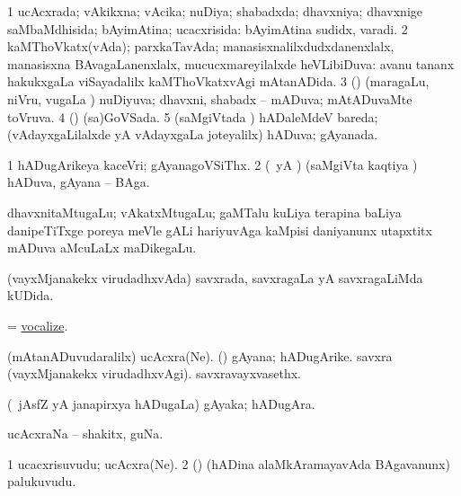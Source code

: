 \bentry
{} 
\gl{\gu}
\expl{}
\bmng
\bnum
\num{1} ucAcxrada; vAkikxna; vAcika; nuDiya; shabadxda; dhavxniya; dhavxnige saMbaMdhisida; bAyimAtina; ucacxrisida:  bAyimAtina sudidx, varadi. 
\num{2} kaMThoVkatx(vAda); parxkaTavAda; manasisxnalilxdudxdanenxlalx, manasisxna BAvagaLanenxlalx, mucucxmareyilalxde heVLibiDuva:  avanu tananx hakukxgaLa viSayadalilx kaMThoVkatxvAgi mAtanADida. 
\num{3} (\kAparx) (maragaLu, niVru, \mo vugaLa \vi) nuDiyuva; dhavxni, shabadx -- mADuva; mAtADuvaMte toVruva. 
\num{4} (\dhavxni) (sa)GoVSada. 
\num{5} (saMgiVtada \vi) hADaleMdeV bareda; (vAdayxgaLilalxde yA vAdayxgaLa joteyalilx) hADuva; gAyanada. 
\enum
\emng
\eentry

\bentry
{} 
\gl{\nA}
\expl{}
\bmng
\bnum
\num{1} hADugArikeya kaceVri; gAyanagoVSiThx. 
\num{2} (\Eva\ yA \bava) (saMgiVta kaqtiya \vi) hADuva, gAyana -- BAga. 
\enum
\emng
\eentry

\bentry 
{} 
\gl{\nA}
\expl{}
\bmng
 dhavxnitaMtugaLu; vAkatxMtugaLu; gaMTalu kuLiya terapina baLiya danipeTiTxge poreya meVle gALi hariyuvAga kaMpisi daniyanunx utapxtitx mADuva aMcuLaLx maDikegaLu. 
\emng
\eentry

\bentry 
{} 
\gl{\gu}
\expl{}
\bmng
 (vayxMjanakekx virudadhxvAda) savxrada, savxragaLa yA savxragaLiMda kUDida. 
\emng
\eentry

\bentry
{} 
\gl{\kirx}
\expl{}
\bmng
 = \hyperlink{vocalize}{vocalize}. 
\emng
\eentry

\bentry 
{} 
\gl{\nA}
\expl{}
\bmng
\bnum
{} 
\banum
{} (mAtanADuvudaralilx) ucAcxra(Ne). 
 (\saM) gAyana; hADugArike. 
\eanum
\numie
{} 
\banum
{} savxra (vayxMjanakekx virudadhxvAgi). 
 savxravayxvasethx. 
\eanum
\numie
\enum
\emng
\eentry

\bentry
{} 
\gl{\nA}
\expl{}
\bmng
 (\kanmu\ jAsfZ yA janapirxya hADugaLa) gAyaka; hADugAra. 
\emng
\eentry

\bentry 
{} 
\gl{\nA}
\expl{}
\bmng
 ucAcxraNa -- shakitx, guNa. 
\emng
\eentry

\bentry 
{} 
\gl{\nA}
\expl{}
\bmng
\bnum
\num{1} ucacxrisuvudu; ucAcxra(Ne). 
\num{2} (\saM) (hADina alaMkAramayavAda BAgavanunx) palukuvudu. 
\enum
\emng
\eentry

